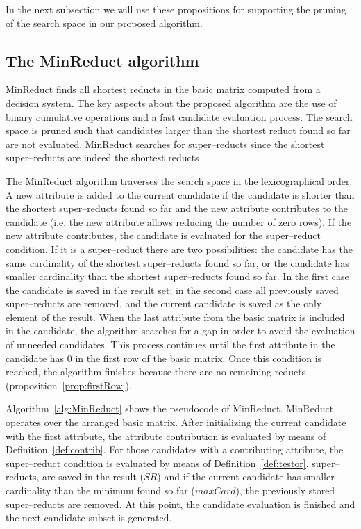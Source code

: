 \documentclass[authoryear,preprint,review,12pt]{elsarticle}
\begin{document}
	In the next subsection we will use these propositions for supporting the pruning of the search space in our proposed algorithm.

\subsection{The MinReduct algorithm}\label{description}

	MinReduct finds all shortest reducts in the basic matrix computed from a decision system. The key aspects about the proposed algorithm are the use of binary cumulative operations and a fast candidate evaluation process. The search space is pruned such that candidates larger than the shortest reduct found so far are not evaluated. MinReduct searches for super--reducts since the shortest super--reducts are indeed the shortest reducts~\citep{Zhou2009}.
	
	The MinReduct algorithm traverses the search space in the lexicographical order. A new attribute is added to the current candidate if the candidate is shorter than the shortest super--reducts found so far and the new attribute contributes to the candidate (i.e. the new attribute allows reducing the number of zero rows). If the new attribute contributes, the candidate is evaluated for the super--reduct condition. If it is a super--reduct there are two possibilities: the candidate has the same cardinality of the shortest super--reducts found so far, or the candidate has smaller cardinality than the shortest super--reducts found so far. In the first case the candidate is saved in the result set; in the second case all previously saved super--reducts are removed, and the current candidate is saved as the only element of the result. When the last attribute from the basic matrix is included in the candidate, the algorithm searches for a gap in order to avoid the evaluation of unneeded candidates. This process continues until the first attribute in the candidate has 0 in the first row of the basic matrix. Once this condition is reached, the algorithm finishes because there are no remaining reducts (proposition~\ref{prop:firstRow}).
	
	Algorithm~\ref{alg:MinReduct} shows the pseudocode of MinReduct. MinReduct operates over the arranged basic matrix.
	After initializing the current candidate with the first attribute, the attribute contribution is evaluated by means of Definition~\ref{def:contrib}. For those candidates with a contributing attribute, the super--reduct condition is evaluated by means of Definition~\ref{def:testor}. super--reducts, are saved in the result ($SR$) and if the current candidate has smaller cardinality than the minimum found so far ($maxCard$), the previously stored super--reducts are removed. At this point, the candidate evaluation is finished and the next candidate subset is generated.
	
\end{document}
